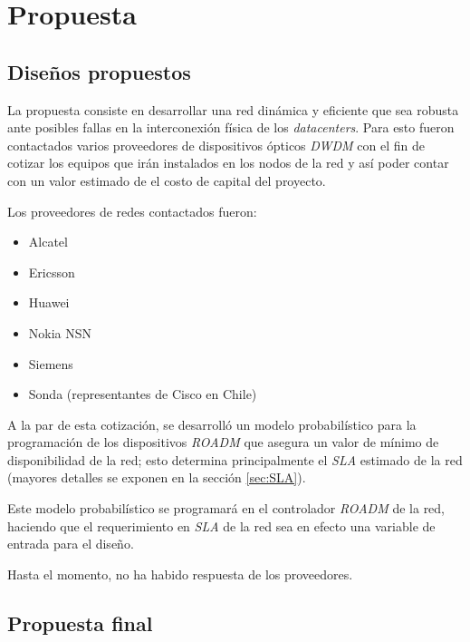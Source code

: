 \section{Propuesta}
\label{sec:propuesta}



\subsection{Diseños propuestos}
\label{sec:disenos}

La propuesta consiste en desarrollar una red dinámica y eficiente que
sea robusta ante posibles fallas en la interconexión física de los
\emph{datacenters}. Para esto fueron contactados varios proveedores de
dispositivos ópticos \emph{DWDM} con el fin de cotizar los equipos que 
irán instalados en los nodos de la red y así poder contar con un valor 
estimado de el costo de capital del proyecto.

Los proveedores de redes contactados fueron:
\begin{itemize}
\item Alcatel
\item Ericsson
\item Huawei
\item Nokia NSN
\item Siemens
\item Sonda (representantes de Cisco en Chile)
\end{itemize}

A la par de esta cotización, se desarrolló un modelo probabilístico 
para la programación de los dispositivos \emph{ROADM}
que asegura un valor de mínimo de disponibilidad de la red; esto
determina principalmente el \emph{SLA} estimado de la red (mayores
detalles se exponen en la sección \ref{sec:SLA}).

Este modelo probabilístico se programará en el controlador
\emph{ROADM} de la red, haciendo que el requerimiento en \emph{SLA} de
la red sea en efecto una variable de entrada para el diseño.





Hasta el momento, no ha habido respuesta de los proveedores.

\subsection{Propuesta final}
\label{sec:ppfinal}

